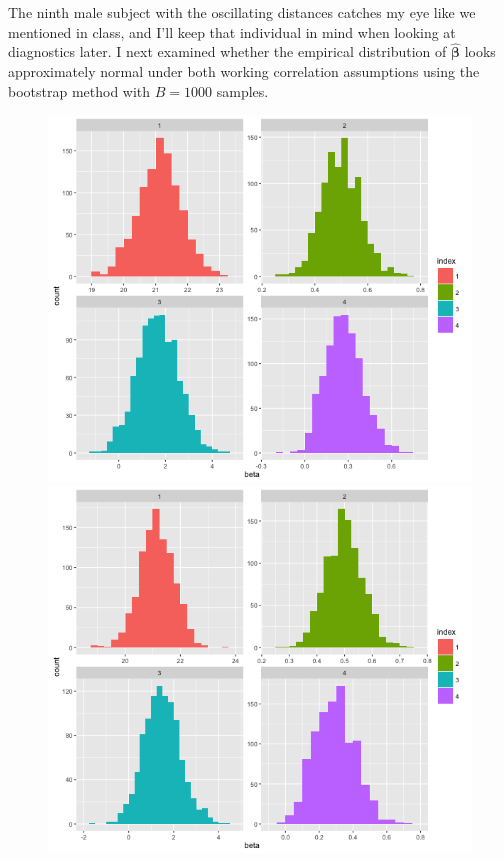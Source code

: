 \documentclass[11pt]{article}
\begin{document}
\begin{enumerate}
\begin{figure}[H]
	\end{figure}
 	The ninth male subject with the oscillating distances catches my eye like we mentioned in class, and I'll keep that individual in mind when looking at diagnostics later. I next examined whether the empirical distribution of $\widehat{\bm{\beta}}$ looks approximately normal under both working correlation assumptions using the bootstrap method with $B=1000$ samples.
		\begin{figure}[H]
			\includegraphics[scale=0.4]{RplotFirstBoot_AR1}
			\includegraphics[scale=0.4]{RplotFirstBoot_Exch}

\end{figure}
\end{enumerate}
\end{document}
